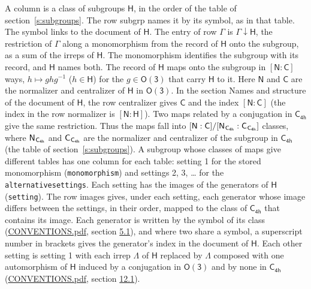 \documentclass[10pt,a4paper]{article}
\numberwithin{equation}{section}
\newcommand{\grp}[1]{\mathsf{#1}}
\newcommand{\grpindex}[2]{[#1 : #2]}
\newcommand{\restr}[2]{#1\!\downarrow#2}
\newcommand{\hairsp}{\mkern1mu}
\begin{document}
A column is a class of subgroups $\grp{H}$, in the order of the table of section~\ref{s:subgroups}. The row subgrp names it by its symbol, as in that table. The symbol links to the document of $\grp{H}$. The entry of row $\Gamma$ is $\restr{\Gamma}{\grp{H}}$, the restriction of $\Gamma$ along a monomorphism from the record of $\grp{H}$ onto the subgroup, as a sum of the irreps of $\grp{H}$. The monomorphism identifies the subgroup with its record, and $\grp{H}$ names both. \label{n:group.normalizer.o3}\label{n:group.centralizer.o3}The record of $\grp{H}$ maps onto the subgroup in $\grpindex{\grp{N}}{\grp{C}}$ ways, $h \mapsto g h g^{-1}$ ($h \in \grp{H}$) for the $g \in \grp{O(3)}$ that carry $\grp{H}$ to it. Here $\grp{N}$ and $\grp{C}$ are the normalizer and centralizer of $\grp{H}$ in \href{O3.pdf}{$\grp{O(3)}$}. In the section Names and structure of the document of $\grp{H}$, the row centralizer gives $\grp{C}$ and the index $\grpindex{\grp{N}}{\grp{C}}$ (the index in the row normalizer is $\grpindex{\grp{N}}{\grp{H}}$). Two maps related by a conjugation in $\grp{C_{4h}}$ give the same restriction. Thus the maps fall into $\grpindex{\grp{N}}{\grp{C}}/\grpindex{\grp{N}_{\hairsp \grp{C_{4h}}}}{\grp{C}_{\hairsp \grp{C_{4h}}}}$ classes, where $\grp{N}_{\hairsp \grp{C_{4h}}}$ and $\grp{C}_{\hairsp \grp{C_{4h}}}$ are the normalizer and centralizer of the subgroup in $\grp{C_{4h}}$ (the table of section~\ref{s:subgroups}). \label{n:head.setting}A subgroup whose classes of maps give different tables has one column for each table: setting 1 for the stored monomorphism (\texttt{monomorphism}) and settings 2, 3, \dots{} for the \texttt{alternativesettings}. Each setting has the images of the generators of $\grp{H}$ (\texttt{setting}). \label{n:head.images}The row images gives, under each setting, each generator whose image differs between the settings, in their order, mapped to the class of $\grp{C_{4h}}$ that contains its image. Each generator is written by the symbol of its class (\href{../../CONVENTIONS.pdf}{CONVENTIONS.pdf}, section \href{../../CONVENTIONS.pdf\#conv.5.1}{5.1}), and where two share a symbol, a superscript number in brackets gives the generator's index in the document of $\grp{H}$. \label{n:irrep.Delta}Each other setting is setting 1 with each irrep $\Lambda$ of $\grp{H}$ replaced by $\Lambda$ composed with one automorphism of $\grp{H}$ induced by a conjugation in \href{O3.pdf}{$\grp{O(3)}$} and by none in $\grp{C_{4h}}$ (\href{../../CONVENTIONS.pdf}{CONVENTIONS.pdf}, section \href{../../CONVENTIONS.pdf\#conv.12.1}{12.1}).
\end{document}
